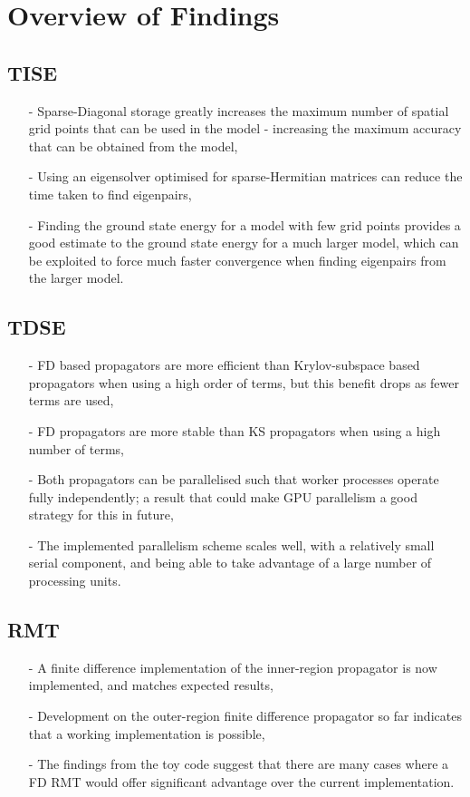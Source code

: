 \section{Overview of Findings}
\subsection{TISE}
\begin{itemize}
	\item[-]{Sparse-Diagonal storage greatly increases the maximum number of spatial grid points that can be used in the model - increasing the maximum accuracy that can be obtained from the model,}
	\item[-]{Using an eigensolver optimised for sparse-Hermitian matrices can reduce the time taken to find eigenpairs,}
	\item[-]{Finding the ground state energy for a model with few grid points provides a good estimate to the ground state energy for a much larger model, which can be exploited to force much faster convergence when finding eigenpairs from the larger model.}
\end{itemize}

\subsection{TDSE}
\begin{itemize}
	\item[-]{FD based propagators are more efficient than Krylov-subspace based propagators when using a high order of terms, but this benefit drops as fewer terms are used,}
	\item[-]{FD propagators are more stable than KS propagators when using a high number of terms,}
	\item[-]{Both propagators can be parallelised such that worker processes operate fully independently; a result that could make GPU parallelism a good strategy for this in future,}
	\item[-]{The implemented parallelism scheme scales well, with a relatively small serial component, and being able to take advantage of a large number of processing units.}
\end{itemize}

\subsection{RMT}
\begin{itemize}
	\item[-]{A finite difference implementation of the inner-region propagator is now implemented, and matches expected results,}
	\item[-]{Development on the outer-region finite difference propagator so far indicates that a working implementation is possible,}
	\item[-]{The findings from the toy code suggest that there are many cases where a FD RMT would offer significant advantage over the current implementation.}
\end{itemize}


